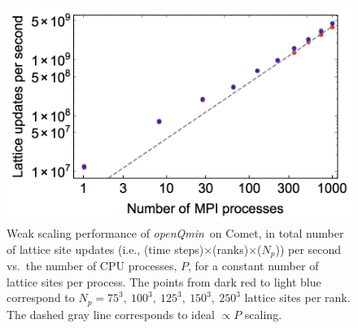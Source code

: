 \documentclass[utf8]{frontiersFPHY} %
\def\PackageName{\textit{openQmin}}
\begin{document}
\begin{figure}[h!]
\begin{center}
\includegraphics[width=15cm]{Fig4Scaling.jpg}
\end{center}
\caption{Weak scaling performance of \PackageName\ on Comet, in total number of lattice site updates (i.e., (time steps)$\times$(ranks)$\times$($N_p$)) per second vs.\ the number of CPU processes, $P$, for a constant number of lattice sites per process. The points from dark red to light blue correspond to $N_p=75^3,\ 100^3,\ 125^3,\ 150^3,\ 250^3$ lattice sites per rank. The dashed gray line corresponds to ideal $\propto P$ scaling.}\label{fig:scaling}
\end{figure}
\end{document}

